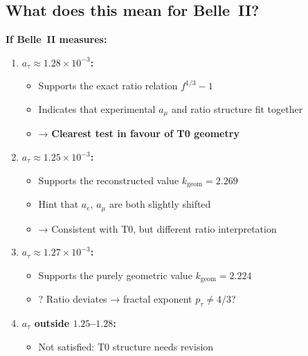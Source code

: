 	\begin{table}[h]
		\centering
		\caption{Three T0 predictions for $a_\tau$}
	\end{table}
	
	\subsection{What does this mean for Belle~II?}
	
	\textbf{If Belle~II measures:}
	
	\begin{enumerate}
		\item \textbf{$a_\tau \approx 1.28 \times 10^{-3}$:}
		\begin{itemize}
			\item Supports the exact ratio relation $f^{1/3} - 1$
			\item Indicates that experimental $a_\mu$ and ratio structure fit together
			\item → \textbf{Clearest test in favour of T0 geometry}
		\end{itemize}
		
		\item \textbf{$a_\tau \approx 1.25 \times 10^{-3}$:}
		\begin{itemize}
			\item Supports the reconstructed value $k_{\text{geom}} = 2.269$
			\item Hint that $a_e$, $a_\mu$ are both slightly shifted
			\item → Consistent with T0, but different ratio interpretation
		\end{itemize}
		
		\item \textbf{$a_\tau \approx 1.27 \times 10^{-3}$:}
		\begin{itemize}
			\item Supports the purely geometric value $k_{\text{geom}} = 2.224$
			\item ? Ratio deviates → fractal exponent $p_\tau \neq 4/3$?
		\end{itemize}
		
		\item \textbf{$a_\tau$ outside $1.25$--$1.28$:}
		\begin{itemize}
			\item Not satisfied: T0 structure needs revision
		\end{itemize}
	\end{enumerate}
	
